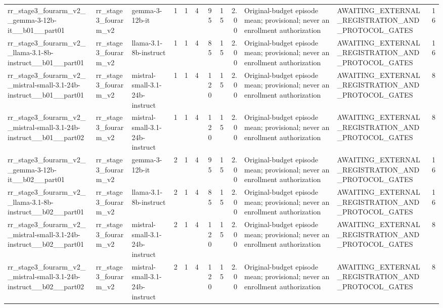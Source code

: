 \begin{tabular}{lllrrrrrrllr}
rr\_stage3\_fourarm\_v2\_\_gemma-3-12b-it\_\_b01\_\_part01 & rr\_stage3\_fourarm\_v2 & gemma-3-12b-it & 1 & 1 & 4 & 95 & 15 & 2.00 & Original-budget episode mean; provisional; never an enrollment authorization & AWAITING\_EXTERNAL\_REGISTRATION\_AND\_PROTOCOL\_GATES & 16 \\
rr\_stage3\_fourarm\_v2\_\_llama-3.1-8b-instruct\_\_b01\_\_part01 & rr\_stage3\_fourarm\_v2 & llama-3.1-8b-instruct & 1 & 1 & 4 & 85 & 15 & 2.00 & Original-budget episode mean; provisional; never an enrollment authorization & AWAITING\_EXTERNAL\_REGISTRATION\_AND\_PROTOCOL\_GATES & 16 \\
rr\_stage3\_fourarm\_v2\_\_mistral-small-3.1-24b-instruct\_\_b01\_\_part01 & rr\_stage3\_fourarm\_v2 & mistral-small-3.1-24b-instruct & 1 & 1 & 4 & 120 & 15 & 2.00 & Original-budget episode mean; provisional; never an enrollment authorization & AWAITING\_EXTERNAL\_REGISTRATION\_AND\_PROTOCOL\_GATES & 8 \\
rr\_stage3\_fourarm\_v2\_\_mistral-small-3.1-24b-instruct\_\_b01\_\_part02 & rr\_stage3\_fourarm\_v2 & mistral-small-3.1-24b-instruct & 1 & 1 & 4 & 120 & 15 & 2.00 & Original-budget episode mean; provisional; never an enrollment authorization & AWAITING\_EXTERNAL\_REGISTRATION\_AND\_PROTOCOL\_GATES & 8 \\
rr\_stage3\_fourarm\_v2\_\_gemma-3-12b-it\_\_b02\_\_part01 & rr\_stage3\_fourarm\_v2 & gemma-3-12b-it & 2 & 1 & 4 & 95 & 15 & 2.00 & Original-budget episode mean; provisional; never an enrollment authorization & AWAITING\_EXTERNAL\_REGISTRATION\_AND\_PROTOCOL\_GATES & 16 \\
rr\_stage3\_fourarm\_v2\_\_llama-3.1-8b-instruct\_\_b02\_\_part01 & rr\_stage3\_fourarm\_v2 & llama-3.1-8b-instruct & 2 & 1 & 4 & 85 & 15 & 2.00 & Original-budget episode mean; provisional; never an enrollment authorization & AWAITING\_EXTERNAL\_REGISTRATION\_AND\_PROTOCOL\_GATES & 16 \\
rr\_stage3\_fourarm\_v2\_\_mistral-small-3.1-24b-instruct\_\_b02\_\_part01 & rr\_stage3\_fourarm\_v2 & mistral-small-3.1-24b-instruct & 2 & 1 & 4 & 120 & 15 & 2.00 & Original-budget episode mean; provisional; never an enrollment authorization & AWAITING\_EXTERNAL\_REGISTRATION\_AND\_PROTOCOL\_GATES & 8 \\
rr\_stage3\_fourarm\_v2\_\_mistral-small-3.1-24b-instruct\_\_b02\_\_part02 & rr\_stage3\_fourarm\_v2 & mistral-small-3.1-24b-instruct & 2 & 1 & 4 & 120 & 15 & 2.00 & Original-budget episode mean; provisional; never an enrollment authorization & AWAITING\_EXTERNAL\_REGISTRATION\_AND\_PROTOCOL\_GATES & 8 \\

\end{tabular}
